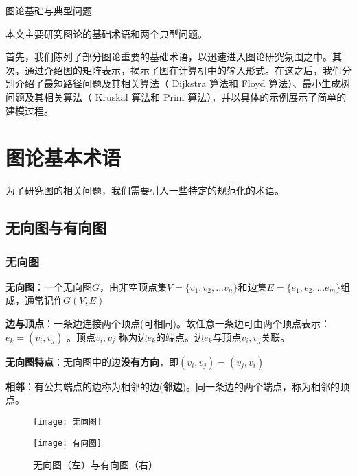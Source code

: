 \documentclass[withoutpreface]{cumcmthesis}
\begin{document}
\begin{abstractpage}{图论基础与典型问题}

  本文主要研究图论的基础术语和两个典型问题。

  首先，我们陈列了部分图论重要的基础术语，以迅速进入图论研究氛围之中。其次，通过介绍图的矩阵表示，揭示了图在计算机中的输入形式。在这之后，我们分别介绍了最短路径问题及其相关算法（ Dijkstra 算法和 Floyd 算法）、最小生成树问题及其相关算法（ Kruskal 算法和 Prim 算法），并以具体的示例展示了简单的建模过程。

\end{abstractpage}

\tocpage

\section{图论基本术语}

为了研究图的相关问题，我们需要引入一些特定的规范化的术语。

\subsection{无向图与有向图}

\subsubsection{无向图}

\textbf{无向图}：一个无向图$G$，由非空顶点集$V=\{v_1,v_2,...v_n\}$和边集$E=\{e_1,e_2,...e_m\}$组成，通常记作$G(V,E)$

\textbf{边与顶点}：一条边连接两个顶点(可相同)。故任意一条边可由两个顶点表示：$e_k=(v_i,v_j)$ 。顶点$v_i,v_j$ 称为边$e_k$的端点。边$e_k$与顶点$v_i,v_j$关联。

\textbf{无向图特点}：无向图中的边\textbf{没有方向}，即$(v_i,v_j)=(v_j,v_i)$

\textbf{相邻}：有公共端点的边称为相邻的边(\textbf{邻边})。同一条边的两个端点，称为相邻的顶点。

\vspace{-1cm}
\begin{figure}[H]
  \centering
  \subfloat
  {
    \begin{minipage}[t]{0.45\textwidth}
      \centering
      \texttt{[image: 无向图]}
    \end{minipage}
  }
  \subfloat
  {
    \begin{minipage}[t]{0.45\textwidth}
      \centering
      \texttt{[image: 有向图]}
    \end{minipage}
  }
  \caption{无向图（左）与有向图（右）} \label{Fig:1}
\end{figure}
\end{document}
